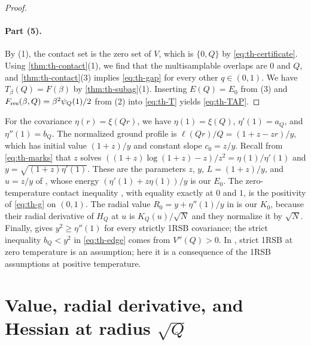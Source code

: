 \begin{proof}
\paragraph{Part (5).}
By (1), the contact set is the zero set of $V$, which is $\{0,Q\}$ by \eqref{eq:th-certificate}. Using \cref{thm:th-contact}(1), we find that the multisamplable overlaps are $0$ and $Q$, and \cref{thm:th-contact}(3) implies \eqref{eq:th-gap} for every other $q\in(0,1)$. We have $T_\beta(Q)=F(\beta)$ by \cref{thm:th-subag}(1). Inserting $E(Q)=E_0$ from (3) and $F_{\rm res}(\beta,Q)=\beta^2\psi_Q(1)/2$ from (2) into \eqref{eq:th-T} yields \eqref{eq:th-TAP}.
\end{proof}

\begin{remark}\label{rem:th-HS}
For the covariance $\eta(r)=\xi(Qr)$, we have $\eta(1)=\xi(Q)$, $\eta'(1)=a_Q$, and $\eta''(1)=b_Q$. The normalized ground profile is $\ell(Qr)/Q=(1+z-zr)/y$, which has initial value $(1+z)/y$ and constant slope $c_0=z/y$. Recall from \eqref{eq:th-marks} that $z$ solves $((1+z)\log(1+z)-z)/z^2=\eta(1)/\eta'(1)$ and $y=\sqrt{(1+z)\eta'(1)}$. These are the parameters $z$, $y$, $L=(1+z)/y$, and $u=z/y$ of \cite[Lemma~3.5]{HuangSellke2024}, whose energy $(\eta'(1)+z\eta(1))/y$ is our $E_0$. The zero-temperature contact inequality \cite[(3.4)]{HuangSellke2024}, with equality exactly at $0$ and $1$, is the positivity of \eqref{eq:th-g} on $(0,1)$. The radial value $R_0=y+\eta''(1)/y$ in \cite[Section~3.2, p.~15, display preceding (3.6)]{HuangSellke2024} is our $K_0$, because their radial derivative of $H_Q$ at $u$ is $K_Q(u)/\sqrt N$ and they normalize it by $\sqrt N$. Finally, \cite[Lemma~3.6]{HuangSellke2024} gives $y^2\ge\eta''(1)$ for every strictly 1RSB covariance; the strict inequality $b_Q<y^2$ in \eqref{eq:th-edge} comes from $V''(Q)>0$. In \cite{HuangSellke2024}, strict 1RSB at zero temperature is an assumption; here it is a consequence of the 1RSB assumptions at positive temperature.
\end{remark}

\section{Value, radial derivative, and Hessian at radius \texorpdfstring{$\sqrt Q$}{sqrt(Q)}}\label{sec:th-marks}

